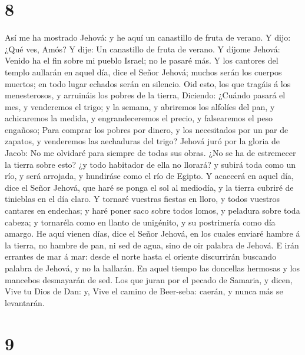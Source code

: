 \hypertarget{section-7}{%
\section{8}\label{section-7}}

 Así me ha mostrado Jehová: y he aquí un canastillo de fruta
de verano.  Y dijo: ¿Qué ves, Amós? Y dije: Un canastillo de
fruta de verano. Y díjome Jehová: Venido ha el fin sobre mi pueblo
Israel; no le pasaré más.  Y los cantores del templo
aullarán en aquel día, dice el Señor Jehová; muchos serán los cuerpos
muertos; en todo lugar echados serán en silencio.  Oid esto,
los que tragáis á los menesterosos, y arruináis los pobres de la tierra,
 Diciendo: ¿Cuándo pasará el mes, y venderemos el trigo; y
la semana, y abriremos los alfolíes del pan, y achicaremos la medida, y
engrandeceremos el precio, y falsearemos el peso engañoso; 
Para comprar los pobres por dinero, y los necesitados por un par de
zapatos, y venderemos las aechaduras del trigo?  Jehová juró
por la gloria de Jacob: No me olvidaré para siempre de todas sus obras.
 ¿No se ha de estremecer la tierra sobre esto? ¿y todo
habitador de ella no llorará? y subirá toda como un río, y será
arrojada, y hundiráse como el río de Egipto.  Y acaecerá en
aquel día, dice el Señor Jehová, que haré se ponga el sol al mediodía, y
la tierra cubriré de tinieblas en el día claro.  Y tornaré
vuestras fiestas en lloro, y todos vuestros cantares en endechas; y haré
poner saco sobre todos lomos, y peladura sobre toda cabeza; y tornaréla
como en llanto de unigénito, y su postrimería como día amargo.
 He aquí vienen días, dice el Señor Jehová, en los cuales
enviaré hambre á la tierra, no hambre de pan, ni sed de agua, sino de
oir palabra de Jehová.  E irán errantes de mar á mar: desde
el norte hasta el oriente discurrirán buscando palabra de Jehová, y no
la hallarán.  En aquel tiempo las doncellas hermosas y los
mancebos desmayarán de sed.  Los que juran por el pecado de
Samaria, y dicen, Vive tu Dios de Dan: y, Vive el camino de Beer-seba:
caerán, y nunca más se levantarán.

\hypertarget{section-8}{%
\section{9}\label{section-8}}

